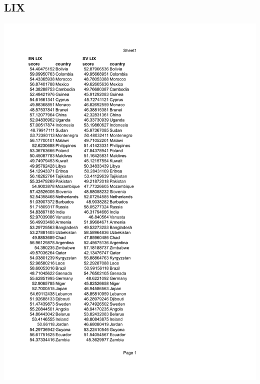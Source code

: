 \documentclass[a4paper]{article}
\begin{document}
\subsection{LIX}
\includegraphics[page=1,scale=0.75]{LIX.pdf}
\end{document}
